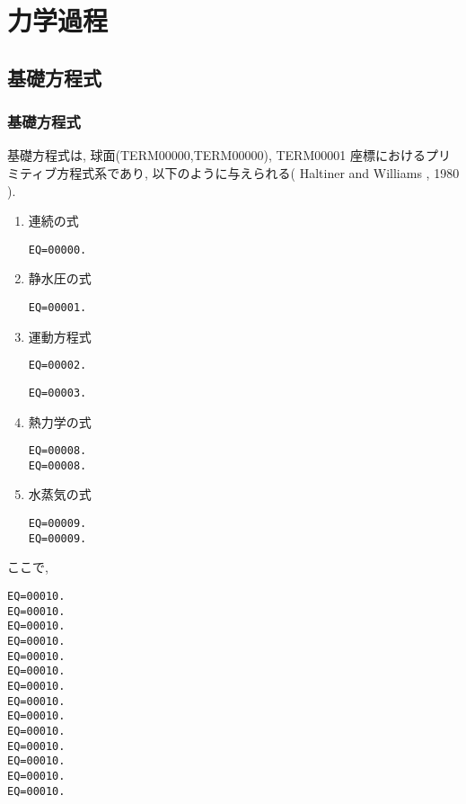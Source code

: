 ﻿
\section{力学過程}

\subsection{基礎方程式}

\subsubsection{基礎方程式}

基礎方程式は,
球面(TERM00000,TERM00000), TERM00001 座標におけるプリミティブ方程式系であり,
以下のように与えられる( Haltiner and Williams , 1980 ).


\begin{enumerate}
\item 連続の式

\begin{verbatim}
EQ=00000.
\end{verbatim}

\item 静水圧の式

\begin{verbatim}
EQ=00001.
\end{verbatim}


\item 運動方程式

\begin{verbatim}
EQ=00002.
\end{verbatim}
\begin{verbatim}
EQ=00003.
\end{verbatim}


\item 熱力学の式

\begin{verbatim}
EQ=00008.
EQ=00008.
\end{verbatim}


\item 水蒸気の式

\begin{verbatim}
EQ=00009.
EQ=00009.
\end{verbatim}

\end{enumerate}

ここで,
%
\begin{verbatim}
EQ=00010.
EQ=00010.
EQ=00010.
EQ=00010.
EQ=00010.
EQ=00010.
EQ=00010.
EQ=00010.
EQ=00010.
EQ=00010.
EQ=00010.
EQ=00010.
EQ=00010.
EQ=00010.
\end{verbatim}

